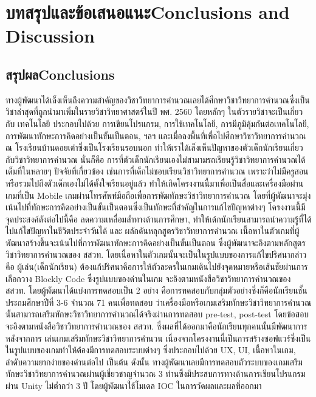\chapter{\ifcpe บทสรุปและข้อเสนอแนะ\else Conclusions and Discussion\fi}

\section{\ifcpe สรุปผล\else Conclusions\fi}

ทางผู้พัฒนาได้เล็งเห็นถึงความสำคัญของวิชาวิทยาการคำนวณเลยได้ศึกษาวิชาวิทยาการคำนวณซึ่งเป็นวิชาล่าสุดที่ถูกนำมาเพิ่มในรายวิชาวิทยาศาสตร์ในปี พศ. 2560 โดยหลักๆ ในตัวรายวิชาจะเป็นเกี่ยวกับ
เทคโนโลยี ประกอบไปด้วย การเขียนโปรแกรม, การใช้เทคโนโลยี, การมีภูมิคุ้มกันต่อเทคโนโลยี, การพัฒนาทักษะการคิดอย่างเป็นขั้นเป็นตอน, ฯลฯ
และเมื่อลงพื้นที่เพื่อไปศึกษาวิชาวิทยาการคำนวณ ณ โรงเรียนบ้านดอยเต่าซึ่งเป็นโรงเรียนรอบนอก ทำให้เราได้เล็งเห็นปัญหาของตัวเด็กนักเรียนเกี่ยวกับวิชาวิทยาการคำนวณ นั่นก็คือ
การที่ตัวเด็กนักเรียนเองไม่สามามรถเรียนรู้วิชาวิทยาการคำนวณได้เต็มที่ในหลายๆ ปัจจัยที่เกี่ยวข้อง เช่นการที่เด็กไม่ชอบเรียนวิชาวิทยาการคำนวณ
เพราะว่าไม่มีครูสอนหรือรวมไปถึงตัวเด็กเองไม่ได้ตั้งใจเรียนอยู่แล้ว ทำให้เกิดโครงงานนี้มาเพื่อเป็นสื่อและเครื่องมือผ่านเกมที่เป็น Mobile เกมผ่านโทรศัพท์มือถือเพื่อการพัฒทักษะวิชาวิทยาการคำนวณ
โดยที่ผู้พัฒนาจะมุ่งเน้นไปที่ทักษะการคิดอย่างเป็นขั้นเป็นตอนซึ่งเป็นทักษะที่สำคัญในการแก้ไขปัญหาต่างๆ
โครงงานนี้มีจุดประสงค์ดังต่อไปนี้คือ ลดความเหลื่อมล้ำทางด้านการศึกษา, ทำให้เด้กนักเรียนสามารถนำความรู้ที่ได้ไปแก้ไขปัญหาในชีวิตประจำวันได้ และ
ผลักดันหลุกสูตรวิชาวิทยาการคำนวณ เนื้อหาในตัวเกมที่ผู้พัฒนาสร้างขึ้นจะเน้นไปที่การพัฒนาทักษะการคิดอย่างเป็นขั้นเป็นตอน
ซึ่งผู้พัฒนาจะอิงตามหลักสูตรวิชาวิทยาการคำนวณของ สสวท. โดยเนื้อหาในตัวเกมนั้นจะเป็นในรูปแบบของการแก้ไขปริศนากล่าวคือ ผู้เล่น(เด็กนักเรียน)
ต้องแก้ปริศนาคือการให้ตัวละครในเกมเดินไปยังจุดหมายหรือเส้นชัยผ่านการเลือกวาง Blockly Code ซึ่งรูปแบบของด่านในเกม
จะอิงตามหนังสือวิชาวิทยาการคำนวณของ สสวท. โดยผู้พัฒนาได้แบ่งการทดสอบเป็น 2 อย่าง คือการทดสอบกับกลุ่มตัวอย่างซึ่งก็คือนักเรียนชั้นประถมศึกษาปีที่ 3-6 จำนวณ 71 คนเพื่อทดสอบ
ว่าเครื่องมือหรือเกมเสริมทักษะวิชาวิทยาการคำนวณนั้นสามารถเสริมทักษะวิชาวิทยาการคำนวณได้จริงผ่านการทดสอบ pre-test, post-test โดยข้อสอบจะอิงตามหนังสือวิชาวิทยาการคำนวณของ สสวท. ซึ่งผลที่ได้ออกมาคือนักเรียนทุกคนนั้นมีพัฒนาการหลังจากการ
เล่นเกมเสริมทักษะวิชาวิทยาการคำนวน เนื่องจากโครงงานนี้เป็นการสร้างซอฟแวร์ซึ่งเป็นในรูปแบบของเกมทำให้ต้องมีการทดสอบระบบต่างๆ ซึ่งประกอบไปด้วย UX, UI, เนื้อหาในเกม, ลำดับความยากง่ายของด่านต่อไป เป็นต้น ดังนั้น
ทางผู้พัฒนาเลยมีการทดสอบตัวระบบของเกมเสริมทักษะวิชาวิทยาการคำนวณผ่านผู้เชี่ยวชาญจำนวณ 3 ท่านซึ่งมีประสบการทางด้านการเขียนโปรแกรมผ่าน Unity ไม่ต่ำกว่า 3 ปี โดยผู้พัฒนาใช้โมเดล IOC ในการวัดผลและผลที่ออกมา
